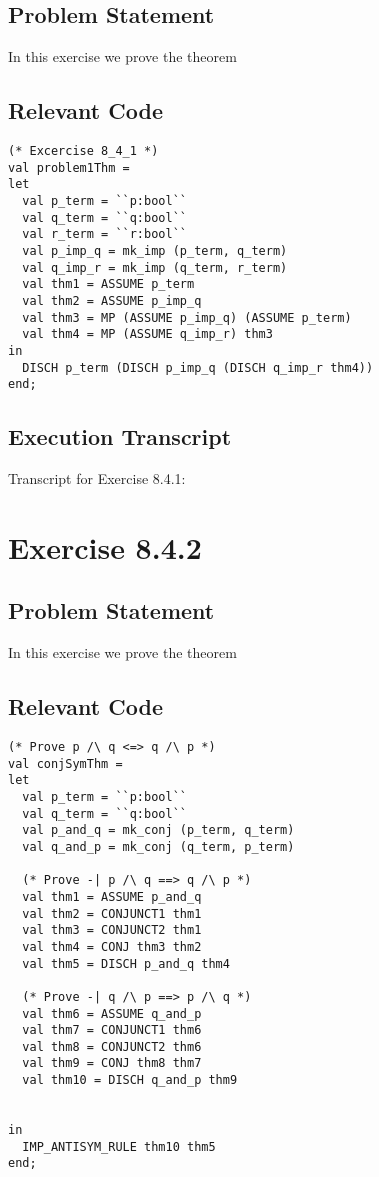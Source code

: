 \documentclass[letterpaper]{report}
\begin{document}
\section{Problem Statement}
In this exercise we prove the theorem
 
\HOLchapterEightTheoremsproblemOneThm

\section{Relevant Code}

\begin{lstlisting}
(* Excercise 8_4_1 *)
val problem1Thm =
let
  val p_term = ``p:bool``
  val q_term = ``q:bool``
  val r_term = ``r:bool``
  val p_imp_q = mk_imp (p_term, q_term)
  val q_imp_r = mk_imp (q_term, r_term)
  val thm1 = ASSUME p_term
  val thm2 = ASSUME p_imp_q
  val thm3 = MP (ASSUME p_imp_q) (ASSUME p_term)
  val thm4 = MP (ASSUME q_imp_r) thm3
in
  DISCH p_term (DISCH p_imp_q (DISCH q_imp_r thm4))
end;
\end{lstlisting}

\section{Execution Transcript}

Transcript for Exercise 8.4.1:





\newpage



\chapter{Exercise 8.4.2}
\label{sec:ex-8-4-2}

\section{Problem Statement}
In this exercise we prove the theorem

\HOLchapterEightTheoremsconjSymThm

\section{Relevant Code}

\begin{lstlisting}
(* Prove p /\ q <=> q /\ p *)
val conjSymThm =
let
  val p_term = ``p:bool``
  val q_term = ``q:bool``
  val p_and_q = mk_conj (p_term, q_term)
  val q_and_p = mk_conj (q_term, p_term)

  (* Prove -| p /\ q ==> q /\ p *)
  val thm1 = ASSUME p_and_q
  val thm2 = CONJUNCT1 thm1
  val thm3 = CONJUNCT2 thm1
  val thm4 = CONJ thm3 thm2
  val thm5 = DISCH p_and_q thm4

  (* Prove -| q /\ p ==> p /\ q *)
  val thm6 = ASSUME q_and_p
  val thm7 = CONJUNCT1 thm6
  val thm8 = CONJUNCT2 thm6
  val thm9 = CONJ thm8 thm7
  val thm10 = DISCH q_and_p thm9


in
  IMP_ANTISYM_RULE thm10 thm5
end;
\end{lstlisting}
\end{document}
